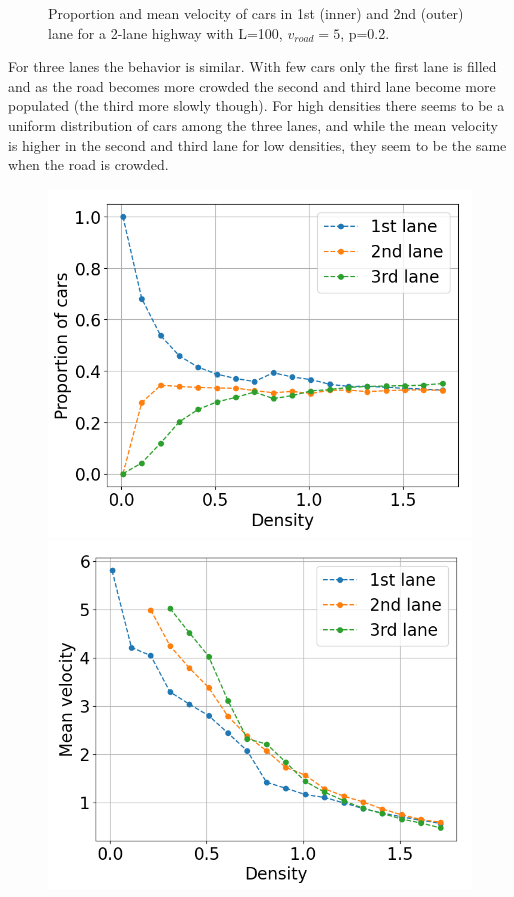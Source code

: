 \documentclass[a4paper,12pt]{article}
\begin{document}
\begin{figure}[H]
\begin{minipage}{.5\textwidth}
    \end{minipage}
    \caption{Proportion and mean velocity of cars in 1st (inner) and 2nd (outer) lane for a 2-lane highway with L=100, $v_{road}=5$, p=0.2.}
    \label{fig45}
\end{figure}

For three lanes the behavior is similar. With few cars only the first lane is filled and as the road becomes more crowded the second and third lane become more populated (the third more slowly though). For high densities there seems to be a uniform distribution of cars among the three lanes, and while the mean velocity is higher in the second and third lane for low densities, they seem to be the same when the road is crowded.
\begin{figure}[H]
	 \centering
    \begin{minipage}{.5\textwidth}
        \centering
        \includegraphics[scale=0.37]{fig8.png}
    \end{minipage}%
    \begin{minipage}{.5\textwidth}
        \centering
        \includegraphics[scale=0.37]{fig9.png}

\end{minipage}
\end{figure}
\end{document}
